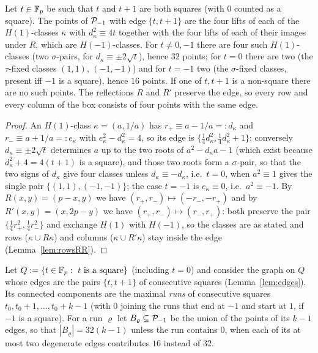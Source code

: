 \begin{lemma}[edges]\label{lem:edges}
Let $t\in\mathbb{F}_p$ be such that $t$ and $t+1$ are both squares (with $0$ counted as a square).  The points of $\mathcal{P}_{-1}$ with edge
$\{t,t+1\}$ are the four lifts of each of the $H(1)$-classes $\kappa$ with $d_\kappa^2\equiv4t$ together with the four lifts of each of
their images under $R$, which are $H(-1)$-classes.  For $t\ne0,-1$ there are four such $H(1)$-classes (two $\sigma$-pairs, for
$d_\kappa\equiv\pm2\sqrt t$), hence $32$ points; for $t=0$ there are two (the $\tau$-fixed classes $(1,1)$, $(-1,-1)$) and for $t=-1$ two
(the $\sigma$-fixed classes, present iff $-1$ is a square), hence $16$ points.  If one of $t,t+1$ is a non-square there are no such points.
The reflections $R$ and $R'$ preserve the edge, so every row and every column of the box consists of four points with the same edge.
\end{lemma}
\begin{proof}
An $H(1)$-class $\kappa=(a,1/a)$ has $r_+\equiv a-1/a=:d_\kappa$ and $r_-\equiv a+1/a=:e_\kappa$ with $e_\kappa^2-d_\kappa^2=4$, so its edge is
$\{\tfrac14d_\kappa^2,\tfrac14d_\kappa^2+1\}$; conversely $d_\kappa\equiv\pm2\sqrt t$ determines $a$ up to the two roots of $a^2-d_\kappa a-1$
(which exist because $d_\kappa^2+4=4(t+1)$ is a square), and those two roots form a $\sigma$-pair, so that the two signs of $d_\kappa$ give
four classes unless $d_\kappa\equiv-d_\kappa$, i.e.\ $t=0$, when $a^2\equiv1$ gives the single pair $\{(1,1),(-1,-1)\}$; the case $t=-1$ is
$e_\kappa\equiv0$, i.e.\ $a^2\equiv-1$.  By $R(x,y)=(p-x,y)$ we have $(r_+,r_-)\mapsto(-r_-,-r_+)$ and by $R'(x,y)=(x,2p-y)$ we have
$(r_+,r_-)\mapsto(r_-,r_+)$: both preserve the pair $\{\tfrac14r_+^2,\tfrac14r_-^2\}$ and exchange $H(1)$ with $H(-1)$, so the classes are as
stated and rows ($\kappa\cup R\kappa$) and columns ($\kappa\cup R'\kappa$) stay inside the edge (Lemma~\ref{lem:rowsRR}).
\end{proof}

Let $Q:=\{t\in\mathbb{F}_p:\ t\ \text{is a square}\}$ (including $t=0$) and consider the graph on $Q$ whose edges are the pairs $\{t,t+1\}$ of
consecutive squares (Lemma~\ref{lem:edges}).  Its connected components are the maximal \emph{runs} of consecutive
squares $t_0,t_0+1,\dots,t_0+k-1$ (with $0$ joining the runs that end at $-1$ and start at $1$, if $-1$ is a square).  For a run $\varrho$
let $B_\varrho\subseteq\mathcal{P}_{-1}$ be the union of the points of its $k-1$ edges, so that $|B_\varrho|=32(k-1)$ unless the run contains
$0$, when each of its at most two degenerate edges contributes $16$ instead of $32$.

